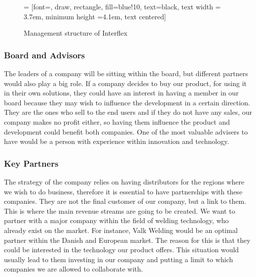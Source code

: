 \begin{figure}[ht]
\centering
     = [font=\footnotesize, draw, rectangle, fill=blue!10, text=black, text width = 3.7em, minimum height =4.1em, text centered]
  \caption{Management structure of Interflex}
  \label{management_structure}
\end{figure}


\subsubsection{Board and Advisors}
The leaders of a company will be sitting within the board, but different partners would also play a big role. 
If a company decides to buy our product, for using it in their own solutions, they could have an interest in having a member in our board because they may wish to influence the development in a certain direction. 
They are the ones who sell to the end users and if they do not have any sales, our company makes no profit either, so having them influence the product and development could benefit both companies. 
One of the most valuable advisers to have would be a person with experience within innovation and technology. 

\subsubsection{Key Partners}
The strategy of the company relies on having distributors for the regions where we wish to do business, therefore it is essential to have partnerships with these companies. They are not the final customer of our company, but a link to them. This is where the main revenue streams are going to be created.
We want to partner with a major company within the field of welding technology, who already exist on the market. 
For instance, Valk Welding would be an optimal partner within the Danish and European market.
The reason for this is that they could be interested in the technology our product offers. This situation would usually lead to them investing in our company and putting a limit to which companies we are allowed to collaborate with.

